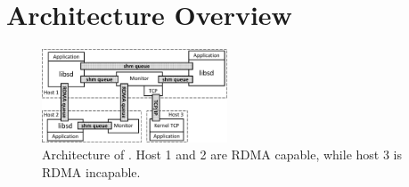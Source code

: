 \section{Architecture Overview}
\label{sec:architecture}


\begin{figure}[t!]
	\centering
	\includegraphics[width=0.49\textwidth]{images/architecture_new}
	\vspace{-20pt}
	\caption{Architecture of \sys{}. Host 1 and 2 are RDMA capable, while host 3 is RDMA incapable.}
	\label{fig:architecture}
	\vspace{5pt}
\end{figure}

